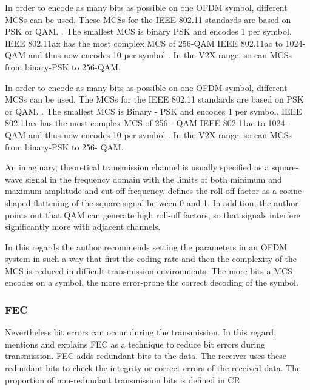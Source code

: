 In order to encode as many bits as possible on one \ac{OFDM} symbol, different \ac{MCS}s can be used.   
These \ac{MCS}s for the IEEE 802.11 standards are based on \ac{PSK} or \ac{QAM}. \cite{kauffels_wireless_2002}. 
The smallest \ac{MCS} is binary \ac{PSK} and encodes \SI{1}{\bit} per symbol. IEEE 802.11ax has the most complex \ac{MCS} of \num{256}-\ac{QAM} IEEE 802.11ac to \num{1024}-\ac{QAM} and thus now encodes \SI{10}{\bit} per symbol \cite{afaqui_ieee_2017}.
In the \ac{V2X} range, so can \ac{MCS}s from binary-\ac{PSK} to \num{256}-\ac{QAM}.

In order to encode as many bits as possible on one \ac{OFDM} symbol, different \ac{MCS}s can be used.   
The \ac{MCS}s for the IEEE 802.11 standards are based on \ac{PSK} or \ac{QAM}. \cite{kauffels_wireless_2002}. 
The smallest \ac{MCS} is Binary - \ac{PSK} and encodes \SI{1}{\bit} per symbol. IEEE 802.11ax has the most complex \ac{MCS} of \num{256} - \ac{QAM} IEEE 802.11ac to \num{1024} - \ac{QAM} and thus now encodes \SI{10}{\bit} per symbol \cite{afaqui_ieee_2017}.
In the \ac{V2X} range, so can \ac{MCS}s from binary-\ac{PSK} to \num{256}- \ac{QAM}.

An imaginary, theoretical transmission channel is usually specified as a square-wave signal in the frequency domain with the limits of both minimum and maximum amplitude and cut-off frequency. \textcite{kauffels_wireless_2002} defines the roll-off factor as a cosine-shaped flattening of the square signal between 0 and 1. In addition, the author points out that \ac{QAM} can generate high roll-off factors, so that signals interfere significantly more with adjacent channels.

In this regards the author recommends setting the parameters in an \ac{OFDM} system in such a way that first the coding rate and then the complexity of the \ac{MCS} is reduced in difficult transmission environments. The more bits a \ac{MCS} encodes on a symbol, the more error-prone the correct decoding of the symbol.

\subsubsection*{\acl{FEC}}

Nevertheless bit errors can occur during the transmission. In this regard, \cite{kauffels_wireless_2002} mentions and explains \ac{FEC} as a technique to reduce bit errors during transmission. \ac{FEC} adds redundant bits to the data. The receiver uses these redundant bits to check the integrity or correct errors of the received data. The proportion of non-redundant transmission bits is defined in \ac{CR} 

